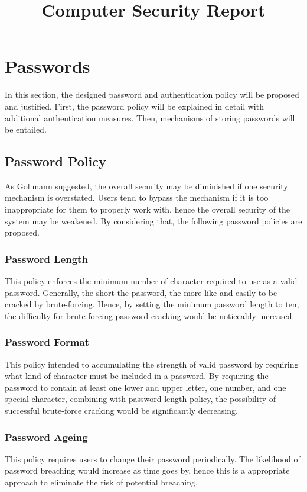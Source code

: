 \documentclass{article}
\title{Computer Security Report}
\begin{document}
%
\maketitle
%

\section{Passwords}
\label{sec:passwd}
In this section, the designed password and authentication policy will be proposed and justified.
First, the password policy will be explained in detail with additional authentication measures.
Then, mechanisms of storing passwords will be entailed.

\subsection{Password Policy}
As Gollmann \cite{GollmannDieter2011Cs/D}suggested, the overall security may be diminished 
if one security mechanism is overstated. Users tend to bypass the mechanism if it is too 
inappropriate for them to properly work with, hence the overall security of the system 
may be weakened. By considering that, the following password policies are proposed.

\subsubsection{Password Length}
This policy enforces the minimum number of character required to use as a valid password. 
Generally, the short the password, the more like and easily to be cracked by brute-forcing.
Hence, by setting the minimum password length to ten, the difficulty for brute-forcing password 
cracking would be noticeably increased.

\subsubsection{Password Format}
This policy intended to accumulating the strength of valid password by requiring what kind 
of character must be included in a password. By requiring the password to contain 
at least one lower and upper letter, one number, and one special character, combining with 
password length policy, the possibility of successful brute-force cracking would 
be significantly decreasing.

\subsubsection{Password Ageing}
This policy requires users to change their password periodically. The likelihood of password 
breaching would increase as time goes by, hence this is a appropriate approach to eliminate the 
risk of potential breaching.
\end{document}
